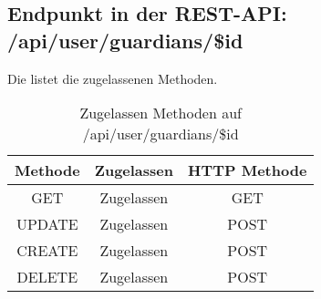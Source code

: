 \subsection{Endpunkt in der REST-API: /api/user/guardians/\$id}
Die  listet die zugelassenen Methoden. 

\begin{table}[!htbp]
	\begin{tabular}{|c|c|c|}
		\hline
			\textbf{Methode} & \textbf{Zugelassen} & \textbf{HTTP Methode} \\ \hline
			GET & Zugelassen & GET \\ \hline
			UPDATE & Zugelassen & POST \\ \hline 
			CREATE & Zugelassen & POST \\ \hline 
			DELETE & Zugelassen & POST \\ \hline
	\end{tabular}

		\caption{Zugelassen Methoden auf /api/user/guardians/\$id}
		\label{tab:end:rest:api:user:guardians:id:meth}
\end{table}